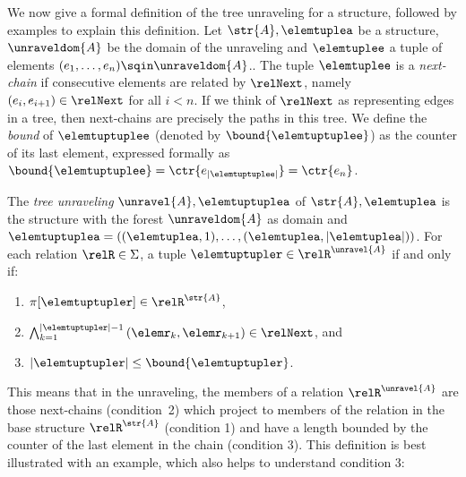 \noindent
We now give a formal definition of the tree unraveling for a structure, followed by examples to explain this definition.
Let $\str{A}, \elemtuplea$ be a structure, $\unraveldom{A}$ be the domain of the unraveling and $\elemtuplee$ a tuple of elements $(e_{1}, \ldots, e_{n}) \sqin \unraveldom{A}$..
The tuple $\elemtuplee$ is a \emph{next-chain} if consecutive elements are related by $\relNext$, namely $(e_{i}, e_{i+1}) \in \relNext$ for all $i < n$.
If we think of $\relNext$ as representing edges in a tree, then next-chains are precisely the paths in this tree.
We define the \emph{bound} of $\elemtuptuplee$ (denoted by $\bound{\elemtuptuplee}$) as the counter of its last element, expressed formally as $\bound{\elemtuptuplee} = \ctr{e_{|\elemtuptuplee|}} = \ctr{e_{n}}$.
\begin{definition}\label{def:tree-unraveling}
The \emph{tree unraveling} $\unravel{A}, \elemtuptuplea$ of $\str{A}, \elemtuplea$ is the structure with the forest $\unraveldom{A}$ as domain and $\elemtuptuplea = ((\elemtuplea, 1), \ldots, (\elemtuplea, |\elemtuplea|))$.
For each relation $\relR \in \Sigma$, a tuple $\elemtuptupler \in \relR^{\unravel{A}}$ if and only if:
\begin{enumerate}
  \item $\pi[\elemtuptupler] \in \relR^{\str{A}}$,
  \item $\bigwedge_{k=1}^{|\elemtuptupler|-1}{(\elemr_{k},\elemr_{k+1}) \in \relNext}$, and
  \item $|\elemtuptupler| \le \bound{\elemtuptupler}$.
\end{enumerate}
\end{definition}
This means that in the unraveling, the members of a relation $\relR^{\unravel{A}}$ are those next-chains (condition~2) which project to members of the relation in the base structure $\relR^{\str{A}}$ (condition 1) and have a length bounded by the counter of the last element in the chain (condition 3).
This definition is best illustrated with an example, which also helps to understand condition 3:

